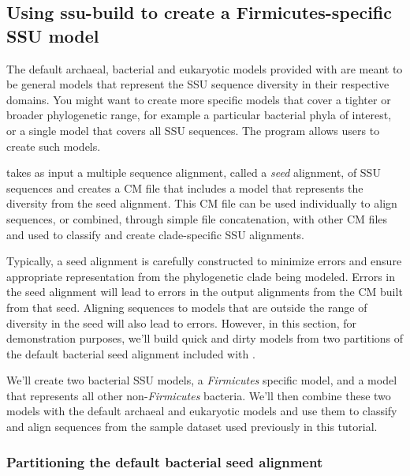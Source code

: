 \subsection{Using ssu-build to create a Firmicutes-specific SSU model}
\label{sec:tutorial-build-firmicutes}

The default archaeal, bacterial and eukaryotic models provided with
 are meant to be general models that represent the SSU
sequence diversity in their respective domains. You might want to
create more specific models that cover a tighter or broader
phylogenetic range, for example a particular bacterial phyla of
interest, or a single model that covers all SSU sequences. The
 program allows users to create such models. 

 takes as input a multiple sequence alignment, called
a \emph{seed} alignment, of SSU sequences and creates a CM file that
includes a model that represents the diversity from the seed
alignment. This CM file can be used individually to align sequences,
or combined, through simple file concatenation, with other CM files
and used to classify and create clade-specific SSU alignments.

Typically, a seed alignment is carefully constructed to minimize
errors and ensure appropriate representation from the phylogenetic
clade being modeled. Errors in the seed alignment will lead to errors
in the output alignments from the CM built from that seed. Aligning
sequences to models that are outside the range of diversity in the
seed will also lead to errors. However, in this section, for
demonstration purposes, we'll build quick and dirty models from two
partitions of the default bacterial seed alignment included with
. 

We'll create two bacterial SSU models, a
\emph{Firmicutes} specific model, and a model that represents all
other non-\emph{Firmicutes} bacteria. We'll then combine these two
models with the default archaeal and eukaryotic models and use them to
classify and align sequences from the  sample dataset
used previously in this tutorial. 

\subsubsection{Partitioning the default bacterial seed alignment}


